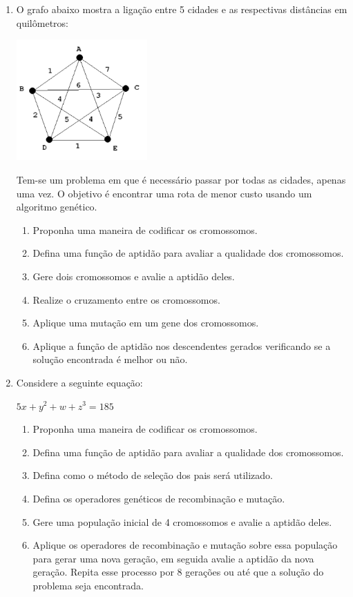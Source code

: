 \documentclass[12pt,a4paper,oneside]{article}
\begin{document}
\begin{enumerate}
	\item O grafo abaixo mostra a ligação entre 5 cidades e as respectivas distâncias em quilômetros:
	
	\begin{center}
		\includegraphics[width=5cm]{images/fig02.png}
	\end{center}
	
	Tem-se um problema em que é necessário passar por todas as cidades, apenas uma vez. O objetivo é encontrar uma rota de menor custo usando um algoritmo genético.
	
	\begin{enumerate}
		\item Proponha uma maneira de codificar os cromossomos.
		\item Defina uma função de aptidão para avaliar a qualidade dos cromossomos.
		\item Gere dois cromossomos e avalie a aptidão deles.
		\item Realize o cruzamento entre os cromossomos.
		\item Aplique uma mutação em um gene dos cromossomos.
		\item Aplique a função de aptidão nos descendentes gerados verificando se a solução encontrada é melhor ou não.
	\end{enumerate}
	
	\newpage
	
	\item Considere a seguinte equação:
	\begin{center}
		$5x + y^2 + w + z^3 = 185$
	\end{center}
	\begin{enumerate}
		\item Proponha uma maneira de codificar os cromossomos.
		\item Defina uma função de aptidão para avaliar a qualidade dos cromossomos.
		\item Defina como o método de seleção dos pais será utilizado.
		\item Defina os operadores genéticos de recombinação e mutação.
		\item Gere uma população inicial de 4 cromossomos e avalie a aptidão deles.
		\item Aplique os operadores de recombinação e mutação sobre essa população para gerar uma nova geração, em seguida avalie a aptidão da nova geração. Repita esse processo por 8 gerações ou até que a solução do problema seja encontrada.
	\end{enumerate}
		
\end{enumerate}
\end{document}
